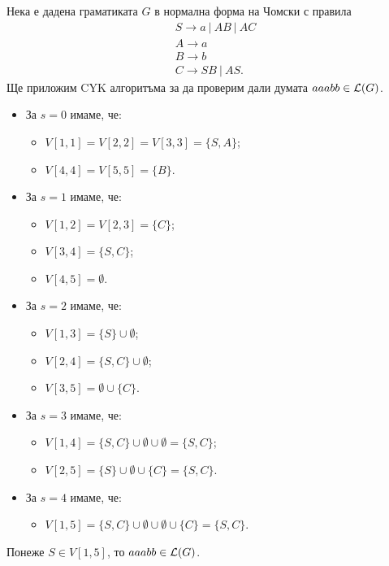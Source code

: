 \begin{example}
  Нека е дадена граматиката $G$ в нормална форма на Чомски с правила 
  \begin{align*}
    & S\rightarrow a\ |\ AB\ |\ AC\\
    & A\rightarrow a\\
    & B\rightarrow b\\
    & C\rightarrow SB\ |\ AS.
  \end{align*}
  Ще приложим CYK алгоритъма за да проверим дали думата $aaabb \in \mathcal{L}(G)$.
  \begin{itemize}
  \item 
    За $s = 0$ имаме, че:
    \begin{itemize}
    \item 
      $V[1,1] = V[2,2] = V[3,3] = \{S,A\}$;
    \item
      $V[4,4] = V[5,5] = \{B\}$.
    \end{itemize}
  \item
    За $s = 1$ имаме, че:
    \begin{itemize}
    \item
      $V[1,2] = V[2,3] = \{C\}$;
    \item
      $V[3,4] = \{S,C\}$;
    \item
      $V[4,5] = \emptyset$.
    \end{itemize}
  \item
    За $s = 2$ имаме, че:
    \begin{itemize}
    \item
      $V[1,3] = \{S\} \cup \emptyset$;
    \item
      $V[2,4] = \{S,C\} \cup \emptyset$;
    \item
      $V[3,5] = \emptyset \cup \{C\}$.
    \end{itemize}
  \item
    За $s = 3$ имаме, че:
    \begin{itemize}
    \item
      $V[1,4] = \{S,C\} \cup \emptyset \cup \emptyset = \{S,C\}$;
    \item
      $V[2,5] = \{S\} \cup \emptyset \cup \{C\} = \{S,C\}$.
    \end{itemize}
  \item
    За $s = 4$ имаме, че:
    \begin{itemize}
    \item 
      $V[1,5] = \{S,C\} \cup \emptyset \cup \emptyset \cup \{C\}= \{S,C\}$.
    \end{itemize}
  \end{itemize}
  Понеже $S \in V[1,5]$, то $aaabb \in \mathcal{L}(G)$.
\end{example}


